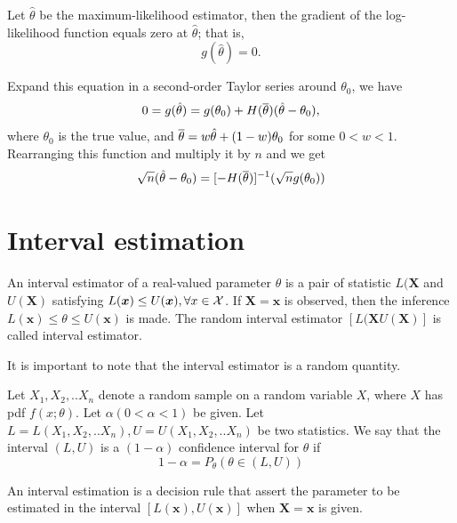 \begin{refsection}
Let $\hat{\theta}$ be the maximum-likelihood estimator, then the gradient of the log-likelihood function equals zero at $\hat{\theta}$; that is,
$$g(\hat{\theta}) = 0.$$

Expand this equation in a second-order Taylor series around $\theta_0$, we have
$$ 0 = g(\hat{\theta}) = g(\theta_0) + H(\overline{\theta})(\hat{\theta} - \theta_0),$$
where $\theta_0$ is the true value, and $\overline{\theta} = w\hat{\theta} + (1-w)\theta_0$ for some $0<w<1$. Rearranging this function and multiply it by $n$ and we get
$$\sqrt{n}(\hat{\theta} - \theta_0) = [-H(\overline{\theta})]^{-1}(\sqrt{n}g(\theta_0))$$







\section{Interval estimation}
\begin{definition}
	\cite[418]{casella2002statistical}
	An interval estimator of a real-valued parameter $\theta$ is a pair of statistic $L(\bm{X}$ and $U(\bm{X})$ satisfying $L(\bm{x}) \leq U(\bm{x}),\forall x\in \mathcal{X}$. If $\bm{X}=\bm{x}$ is observed, then the inference $L(\bm{x}) \leq\theta \leq U(\bm{x})$ is made. The random interval estimator $[L(\bm{X} U(\bm{X})]$ is called interval estimator.  
\end{definition}

\begin{remark}
	It is important to note that the interval estimator is a random quantity.
\end{remark}

\begin{definition}
	Let $X_1,X_2,..X_n$ denote a random sample on a random variable $X$, where $X$ has pdf $f(x;\theta)$. Let $\alpha (0 < \alpha < 1)$ be given. Let $L=L(X_1,X_2,..X_n), U = U(X_1,X_2,..X_n)$ be two statistics. We say that the interval $(L,U)$ is a $(1-\alpha)$ confidence interval for $\theta$ if
	$$1-\alpha = P_{\theta}(\theta\in (L,U))$$
\end{definition}




\begin{definition}
	An interval estimation is a decision rule that assert the parameter to be estimated in the interval $[L(\bm{x}),U(\bm{x})]$ when $\bm{X}=\bm{x}$ is given. 
\end{definition}


\end{refsection}
